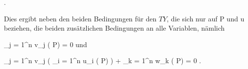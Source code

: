 { { . }

Dies ergibt neben den beiden Bedingungen für den $TY$, die sich nur auf
\mathkor {} {P} {und} {u} {}
beziehen, die beiden zusätzlichen Bedingungen an alle Variablen, nämlich

\mavergleichskettedisp
{\vergleichskette
{ \sum_{j = 1}^n v_j {  } ( P)
}
{ =} { 0
}
{ } {
}
{ } {
}
{ } {
}
}
{}{}{}
und

\mavergleichskettedisp
{\vergleichskette
{ \sum_{j = 1}^n v_j  \left(  \sum_{i = 1}^n u_i {  }  {  } ( P)  \right)      + \sum_{k = 1}^n w_k {  } ( P)
}
{ =} { 0
}
{ } {
}
{ } {
}
{ } {
}
}
{}{}{.}

}

